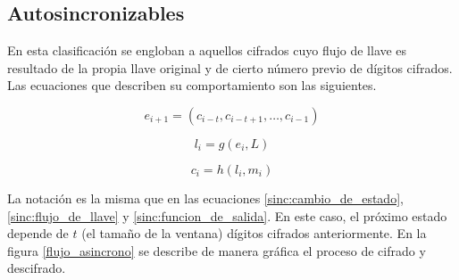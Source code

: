 %
%

\subsection{Autosincronizables}

En esta clasificación se engloban a aquellos cifrados cuyo flujo de llave es
resultado de la propia llave original y de cierto número previo de dígitos
cifrados. Las ecuaciones que describen su comportamiento son las siguientes.

\begin{equation}
  \label{asinc:cambio_de_estado}
  e_{i+1} = (c_{i - t}, c_{i - t + 1}, \dots, c_{i - 1})
\end{equation}

\begin{equation}
  \label{asinc:flujo_de_llave}
  l_i = g(e_i, L)
\end{equation}

\begin{equation}
  \label{asinc:funcion_de_salida}
  c_i = h(l_i, m_i)
\end{equation}

La notación es la misma que en las ecuaciones \ref{sinc:cambio_de_estado},
\ref{sinc:flujo_de_llave} y \ref{sinc:funcion_de_salida}. En este caso, el
próximo estado depende de $ t $ (el tamaño de la ventana) dígitos cifrados
anteriormente. En la figura \ref{flujo_asincrono} se describe de manera
gráfica el proceso de cifrado y descifrado.

